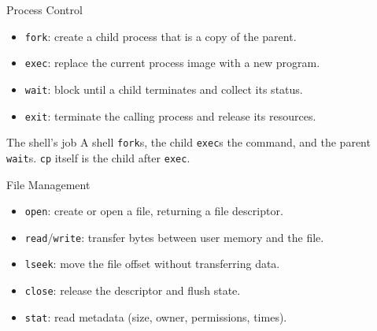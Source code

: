 \documentclass[aspectratio=169]{beamer}
\begin{document}
\begin{frame}{Process Control}
  \begin{itemize}
    \item \texttt{fork}: create a child process that is a copy of the parent.
    \item \texttt{exec}: replace the current process image with a new program.
    \item \texttt{wait}: block until a child terminates and collect its status.
    \item \texttt{exit}: terminate the calling process and release its
      resources.
  \end{itemize}
  \vspace{0.2cm}
  \begin{exampleblock}{The shell's job}
    A shell \texttt{fork}s, the child \texttt{exec}s the command, and the
    parent \texttt{wait}s. \texttt{cp} itself is the child after \texttt{exec}.
  \end{exampleblock}
\end{frame}

\begin{frame}{File Management}
  \begin{itemize}
    \item \texttt{open}: create or open a file, returning a file descriptor.
    \item \texttt{read}/\texttt{write}: transfer bytes between user memory and
      the file.
    \item \texttt{lseek}: move the file offset without transferring data.
    \item \texttt{close}: release the descriptor and flush state.
    \item \texttt{stat}: read metadata (size, owner, permissions, times).
  \end{itemize}
  \vspace{0.2cm}
\end{frame}
\end{document}
